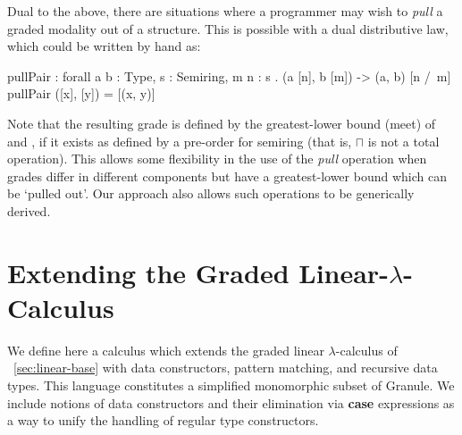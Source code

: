 Dual to the above, there are situations where a programmer may wish to
\emph{pull} a graded modality out of a structure. This is possible with a dual
distributive law, which could be written by hand as:
%
\begin{granule}
pullPair : forall { a b : Type, s : Semiring, m n : s } 
         . (a [n], b [m]) -> (a, b) [n /\ m]
pullPair ([x], [y]) = [(x, y)]
\end{granule}
%
Note that the resulting grade is defined by the greatest-lower bound (meet) of
 and , if it exists as defined by a pre-order for semiring
 (that is, $\sqcap$ is not a total operation). This allows some
flexibility in the use of the \emph{pull} operation when grades differ in
different components but have a greatest-lower bound which can be `pulled out'.
Our approach also allows such operations to be generically derived.

%



\section{Extending the Graded Linear-$\lambda$-Calculus}
\label{sec:der-calculus}
We define here a calculus which extends the graded linear
$\lambda$-calculus of ~\ref{sec:linear-base} with data constructors, pattern
matching, and recursive data types. This language constitutes a simplified
monomorphic subset of Granule. We include notions of data constructors and their
elimination via \textbf{case} expressions as a way to unify the handling of
regular type constructors.

